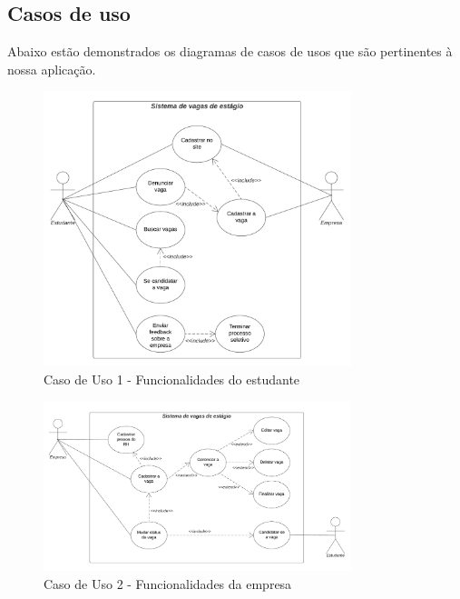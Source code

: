 \subsection{Casos de uso}

Abaixo estão demonstrados os diagramas de casos de usos que são pertinentes à nossa aplicação.

\begin{figure}[H]
	\centering 
	\caption{\label{fig:caso1}Caso de Uso 1 - Funcionalidades do estudante}
	\includegraphics[width=0.8\textwidth]{imagens/caso-de-uso-1.png} 
\end{figure}

\begin{figure}[H]
	\centering 
	\caption{\label{fig:caso2}Caso de Uso 2 - Funcionalidades da empresa}
	\includegraphics[width=0.8\textwidth]{imagens/caso-de-uso-2.png} 
\end{figure}

